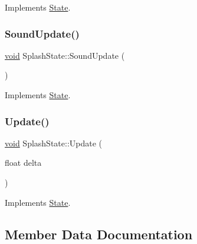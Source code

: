 Implements \hyperlink{classState_a0e48dfae1e3090630475812681417c5f}{State}.

\mbox{\label{classSplashState_adff14b96ab0de144e0052326819e7f2e}} 
\subsubsection{\texorpdfstring{Sound\+Update()}{SoundUpdate()}}
{\footnotesize\ttfamily \hyperlink{imgui__impl__opengl3__loader_8h_ac668e7cffd9e2e9cfee428b9b2f34fa7}{void} Splash\+State\+::\+Sound\+Update (\begin{DoxyParamCaption}{ }\end{DoxyParamCaption})\hspace{0.3cm}{\ttfamily [virtual]}}



Implements \hyperlink{classState_a6572089fbf2178bf5c582cc27d6d3925}{State}.

\mbox{\label{classSplashState_af19b293ae1e914e13db4382115e56d2c}} 
\subsubsection{\texorpdfstring{Update()}{Update()}}
{\footnotesize\ttfamily \hyperlink{imgui__impl__opengl3__loader_8h_ac668e7cffd9e2e9cfee428b9b2f34fa7}{void} Splash\+State\+::\+Update (\begin{DoxyParamCaption}\item[{float}]{delta }\end{DoxyParamCaption})\hspace{0.3cm}{\ttfamily [virtual]}}



Implements \hyperlink{classState_aac0d3fdee1341e168af730b8f31a7bf1}{State}.



\subsection{Member Data Documentation}
\mbox{\label{classSplashState_af1176a8c13fcd1dc47263064d6b081d5}} 
